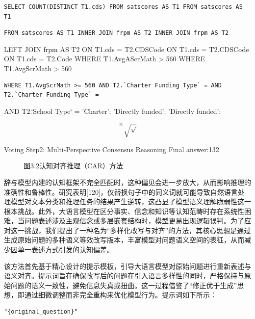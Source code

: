 \documentclass[12pt,a4paper,openright,UTF8]{ctexbook}
\begin{document}
\begin{lstlisting}
SELECT COUNT(DISTINCT T1.cds) FROM satscores AS T1 FROM satscores AS T1
\end{lstlisting}


\begin{lstlisting}
FROM satscores AS T1 INNER JOIN frpm AS T2 INNER JOIN frpm AS T2
\end{lstlisting}

LEFT JOIN frpm AS T2 ON T1.cds = T2.CDSCode ON T1.cds = T2.CDSCode ON T1.cds = T2.Code WHERE T1.AvgAScrMath > 560 WHERE T1.AvgScrMath > 560

\begin{lstlisting}
WHERE T1.AvgScrMath >= 560 AND T2.`Charter Funding Type` = AND T2.`Charter Funding Type` =
\end{lstlisting}

AND T2.`School Type` = 'Charter'; 'Directly funded'; 'Directly funded';

\begin{equation}
\times \sqrt \sqrt
\end{equation}

Voting Step2: Multi-Perspective Consensus Reasoning Final answer:132

\begin{figure}[htbp]
\centering
{}
\caption{图3.2认知对齐推理（CAR）方法}
\end{figure}

辞与模型内建的认知框架不完全匹配时，这种偏见会进一步放大，从而影响推理的准确性和鲁棒性。研究表明[120]，仅替换句子中的同义词就可能导致自然语言处理模型对文本分类和推理任务的结果产生逆转，这凸显了模型语义理解脆弱性这一根本挑战。此外，大语言模型在区分事实、信念和知识等认知范畴时存在系统性困难，当问题表述涉及主观信念或多层嵌套结构时，模型更易出现逻辑误判。为了应对这一挑战，我们提出了一种名为“多样化改写与对齐”的方法，其核心思想是通过生成原始问题的多种语义等效改写版本，丰富模型对问题语义空间的表征，从而减少因单一表述方式引发的认知偏差。


该方法首先基于精心设计的提示模板，引导大语言模型对原始问题进行重新表述与语义对齐。提示词旨在确保改写后的问题在引入语言多样性的同时，严格保持与原始问题的语义一致性，避免信息失真或扭曲。这一过程借鉴了“修正优于生成”思想，即通过细微调整而非完全重构来优化模型行为。提示词如下所示：

\begin{lstlisting}
"{original_question}"
\end{lstlisting}
\end{document}

